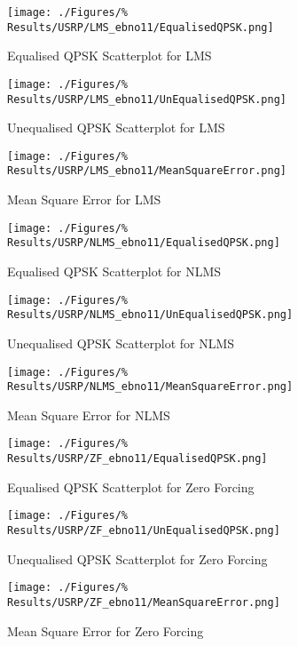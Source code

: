 \begin{figure}[ht]
	\centering
	\begin{minipage}{0.49\textwidth}
		\centering
		\texttt{[image: ./Figures/\%
		Results/USRP/LMS\_ebno11/EqualisedQPSK.png]}
		\caption{Equalised QPSK Scatterplot for LMS}
	\end{minipage}
	\begin{minipage}{0.49\textwidth}
		\centering
		\texttt{[image: ./Figures/\%
		Results/USRP/LMS\_ebno11/UnEqualisedQPSK.png]}
		\caption{Unequalised QPSK Scatterplot for LMS}
	\end{minipage}
\end{figure}
\begin{figure}[ht]
	\centering
	\texttt{[image: ./Figures/\%
	Results/USRP/LMS\_ebno11/MeanSquareError.png]}
	\caption{Mean Square Error for LMS}
\end{figure}

\begin{figure}[ht]
	\centering
	\begin{minipage}{0.49\textwidth}
		\centering
		\texttt{[image: ./Figures/\%
		Results/USRP/NLMS\_ebno11/EqualisedQPSK.png]}
		\caption{Equalised QPSK Scatterplot for NLMS}
	\end{minipage}
	\begin{minipage}{0.49\textwidth}
		\centering
		\texttt{[image: ./Figures/\%
		Results/USRP/NLMS\_ebno11/UnEqualisedQPSK.png]}
		\caption{Unequalised QPSK Scatterplot for NLMS}
	\end{minipage}
\end{figure}
\begin{figure}[ht]
	\centering
	\texttt{[image: ./Figures/\%
	Results/USRP/NLMS\_ebno11/MeanSquareError.png]}
	\caption{Mean Square Error for NLMS}
\end{figure}

\begin{figure}[ht]
	\centering
	\begin{minipage}{0.49\textwidth}
		\centering
		\texttt{[image: ./Figures/\%
		Results/USRP/ZF\_ebno11/EqualisedQPSK.png]}
		\caption{Equalised QPSK Scatterplot for Zero 
		Forcing}
	\end{minipage}
	\begin{minipage}{0.49\textwidth}
		\centering
		\texttt{[image: ./Figures/\%
		Results/USRP/ZF\_ebno11/UnEqualisedQPSK.png]}
		\caption{Unequalised QPSK Scatterplot for Zero 
		Forcing}
	\end{minipage}
\end{figure}
\begin{figure}[ht]
	\centering
	\texttt{[image: ./Figures/\%
	Results/USRP/ZF\_ebno11/MeanSquareError.png]}
	\caption{Mean Square Error for Zero Forcing}
\end{figure}

